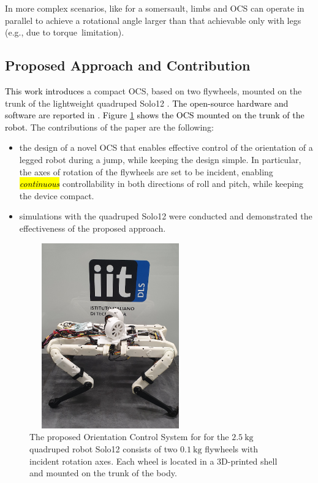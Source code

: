 \documentclass[sensors,article,accept,pdftex,moreauthors]{Definitions/mdpi}
\newcommand{\MF}[1]{\textcolor{black}{#1}}
\begin{document}
In more complex scenarios, like for a somersault, limbs and OCS can operate in parallel to achieve a rotational angle larger than that achievable only with legs (e.g., due to to\mbox{rque limita}tion). 


\subsection{Proposed Approach and Contribution}

\MF{This work introduces} a compact OCS, based on two flywheels, mounted on the trunk of the lightweight quadruped Solo12 \cite{grimminger2020open}. \MF{The open-source hardware and software are reported in \cite{github_solo}. Figure \ref{fig:solo12flywheels} shows the OCS mounted on the trunk of the robot.} The contributions of the paper are the following:
\begin{itemize}
	\item the design of a novel OCS that enables effective control of the orientation of a legged robot during a jump, while keeping the design simple. 
	In particular, the axes of rotation of the flywheels are set to be incident, enabling \hl{\textit{continuous}} %
 controllability in both directions of roll and pitch, while keeping the device compact.
	\item simulations  with the quadruped Solo12 were conducted and demonstrated the effectiveness of the proposed approach.
\end{itemize}

\begin{figure}[H]%
	 
	\includegraphics[width=7cm,height=8cm,keepaspectratio]{figures/solo_fw_pic_compressed.png}
	\caption{\small The proposed Orientation Control System for 
		for the $2.5 \ \mathrm{kg}$ quadruped robot Solo12 consists of two $0.1 \ \mathrm{kg}$ flywheels with incident rotation axes. Each wheel is located in a 3D-printed shell and mounted on the trunk of the body.}
	\label{fig:solo12flywheels}
\end{figure} 
\end{document}
